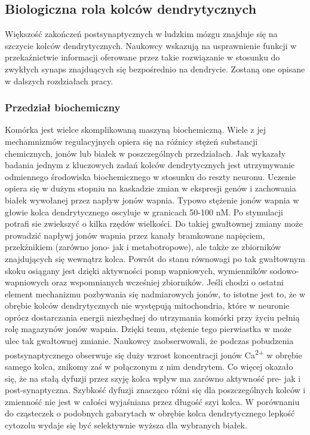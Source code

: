 \documentclass{article}
\begin{document}
\subsection{Biologiczna rola kolców dendrytycznych}
Większość zakończeń postsynaptycznych %
w ludzkim mózgu znajduje się na szczycie kolców dendrytycznych.
Naukowcy wskazują na usprawnienie funkcji w przekaźnictwie informacji oferowane przez takie rozwiązanie w stosunku do zwykłych synaps znajduących się bezpośrednio na dendrycie.
Zostaną one opisane w dalszych rozdziałach pracy.
\subsubsection{Przedział biochemiczny}
Komórka jest wielce skomplikowaną maszyną biochemiczną. 
Wiele z jej mechamnizmów regulacyjnych opiera się na róźnicy stężeń substancji chemicznych, jonów lub białek w poszczególnych przedziałach.
Jak wykazały badania jednym z kluczowych zadań kolców dendrytycznych jest utrzymywanie odmiennego środowiska biochemicznego w stosunku do reszty neuronu.
Uczenie opiera się w dużym stopniu na kaskadzie zmian w ekspresji genów i zachowania białek wywołanej przez napływ jonów wapnia.
Typowo stężenie jonów wapnia w głowie kolca dendrytycznego oscyluje w granicach 50-100 nM.
Po stymulacji potrafi sie zwiekszyć o kilka rzędów wielkości.
Do takiej gwałtownej zmiany może prowadzić napływj jonów wapnia przez kanały bramkowane napięciem, przekźnikiem (zarówno jono- jak i metabotropowe), ale także ze zbiorników znajdujących się wewnątrz kolca.
Powrót do stanu równowagi po tak gwałtownym skoku osiągany jest dzięki aktywności pomp wapniowych, wymienników sodowo-wapniowych oraz wspomnianych wcześniej zbiorników.
Jeśli chodzi o ostatni element mechanizmu pozbywania się nadmiarowych jonów, to istotne jest to, że w obrębie kolców dendrytycznych nie występują mitochondria, które w neuronie oprócz dostarczania energii niezbędnej do utrzymania komórki przy życiu pełnią rolę magazynów jonów wapnia. 
Dzięki temu, stężenie tego pierwiastka w może ulec tak gwałtownej zmianie\citep{Sala2014}.
Naukowcy zaobserwowali, że podczas pobudzenia postsynaptycznego obserwuje się duży wzrost koncentracji jonów Ca\textsuperscript{2+} w obrębie samego kolca, znikomy zaś w połączonym z nim dendrytem.
Co więcej okazało się, że na stałą dyfuzji przez szyję kolca wpływ ma zarówno aktywność pre- jak i post-synaptyczna.
Szybkość dyfuzji znacząco różni się dla poszczególnych kolców i zmienność nie jest w całości wyjaśniana przez długość szyi kolca.
W porównaniu do cząsteczek o podobnych gabarytach w obrębie kolca dendrytycznego lepkość cytozolu wydaje się być selektywnie wyższa dla wybranych białek.
\end{document}
